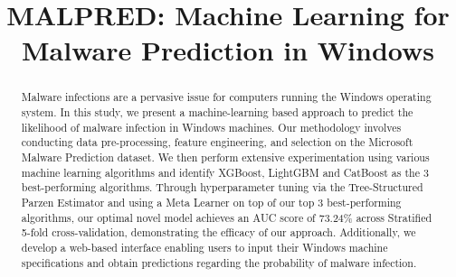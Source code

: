 \documentclass[runningheads]{llncs}
\begin{document}
%
\title{MALPRED: Machine Learning for Malware Prediction in Windows}
%
%
\author{
}
%
\authorrunning{
}
%
\institute{
}
%
\maketitle              %
%
\begin{abstract}
Malware infections are a pervasive issue for computers running the Windows operating system. In this study, we present a machine-learning based approach to predict the likelihood of malware infection in Windows machines. Our methodology involves conducting data pre-processing, feature engineering, and selection on the Microsoft Malware Prediction dataset. We then perform extensive experimentation using various machine learning algorithms and identify XGBoost, LightGBM and CatBoost as the 3 best-performing algorithms. Through hyperparameter tuning via the Tree-Structured Parzen Estimator and using a Meta Learner on top of our top 3 best-performing algorithms, our optimal novel model achieves an AUC score of 73.24\% across Stratified 5-fold cross-validation, demonstrating the efficacy of our approach. Additionally, we develop a web-based interface enabling users to input their Windows machine specifications and obtain predictions regarding the probability of malware infection.

\end{abstract}
\end{document}
